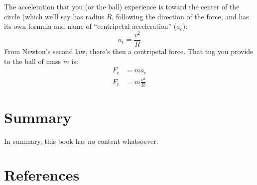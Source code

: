 \documentclass[
  letterpaper,
  DIV=11,
  numbers=noendperiod,
  oneside]{scrreprt}
\newlength{\cslhangindent}
\newenvironment{CSLReferences}[2] %
 {\begin{list}{}{%
  \setlength{\itemindent}{0pt}
  \setlength{\leftmargin}{0pt}
  \setlength{\parsep}{0pt}
  \ifodd #1
   \setlength{\leftmargin}{\cslhangindent}
   \setlength{\itemindent}{-1\cslhangindent}
  \fi
  \setlength{\itemsep}{#2\baselineskip}}}
 {\end{list}}
\begin{document}
The acceleration that you (or the ball) experience is toward the center
of the circle (which we'll say has radius \(R\), following the direction
of the force, and has its own formula and name of ``centripetal
acceleration'' (\(a_c\)): \[
a_c=\frac{v^2}{R} \label{centripetala}
\] From Newton's second law, there's then a centripetal force. That tug
you provide to the ball of mass \(m\) is: \[
\begin{align}
F_c &= m a_c \nonumber \\
F_c &=m \frac{v^2}{R} \label{centripetalf}
\end{align}
\]


\chapter{Summary}\label{summary}

In summary, this book has no content whatsoever.


\chapter*{References}\label{references}


\label{refs}
\begin{CSLReferences}{0}{1}
\end{CSLReferences}
\end{document}
